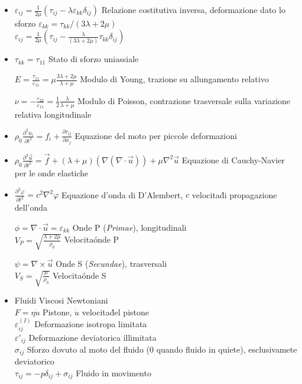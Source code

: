 \documentclass[a4paper]{article}
\begin{document}
\begin{itemize}
	\item $\varepsilon_{ij}=\frac{1}{2 \mu} (\tau_{ij}-\lambda \varepsilon_{kk} \delta_{ij})$ Relazione costitutiva inversa, deformazione dato lo sforzo	
	$\varepsilon_{kk}=\tau_{kk}/(3\lambda+2\mu)$\\
	$\varepsilon_{ij}=\frac{1}{2 \mu} (\tau_{ij}-  \frac{\lambda }{(3\lambda+2\mu)} \tau_{kk} \delta_{ij})$
	
	\item $\tau_{kk}=\tau_{11}$ Stato di sforzo uniassiale
	
	$E=\frac{\tau_{11}}{\varepsilon_{11}}=\mu \frac{3\lambda + 2\mu}{\lambda + \mu}$ Modulo di Young, trazione su allungamento relativo
	
	$\nu=-\frac{\varepsilon_{22}}{\varepsilon_{11}}=\frac{1}{2}\frac{\lambda}{\lambda+ \mu}$ Modulo di Poisson, contrazione trasversale sulla variazione relativa longitudinale
	
	\item $\rho_0 \frac{\partial^2 u_i}{\partial t^2} =f_i+ \frac{\partial \tau_{ij}}{\partial x_j} $ Equazione del moto per piccole deformazioni
	
	\item $\rho_0 \frac{\partial^2 \overrightarrow{u}}{\partial t^2} = \overrightarrow{f}+ (\lambda+\mu) (\nabla(\nabla \cdot \overrightarrow{u}))+\mu \nabla^2 \overrightarrow{u} $ Equazione di Cauchy-Navier per le onde elastiche
	
	\item $\frac{\partial^2 \varphi}{\partial t^2}=c^2 \nabla^2 \varphi$ Equazione d'onda di D'Alembert, $c$ velocita\' di propagazione dell'onda
	
	$\phi=\nabla \cdot \overrightarrow{u} = \varepsilon_{kk}$ Onde P (\textit{Primae}), longitudinali\\
	$V_P= \sqrt{\frac{\lambda+2\mu}{\rho_0}}$ Velocita\' onde P
	
	$\psi = \nabla \times \overrightarrow{u}$ Onde S (\textit{Secundae}), trasversali\\
	$V_S = \sqrt{\frac{\mu}{\rho_0}}$ Velocita\' onde S
	
	\item Fluidi  Viscosi Newtoniani\\
	$F = \eta \dot{u}$ Pistone, $\dot{u}$ velocita\' del pistone\\
	$\varepsilon^{(I)}_{ij}$ Deformazione isotropa limitata\\
	$\varepsilon'_{ij}$ Deformazione deviatorica illimitata\\
	$\sigma_{ij}$ Sforzo dovuto al moto del fluido (0 quando fluido in quiete), esclusivamete deviatorico\\
	$\tau_{ij}=-p \delta_{ij}+\sigma_{ij}$ Fluido in movimento
	

\end{itemize}
\end{document}
